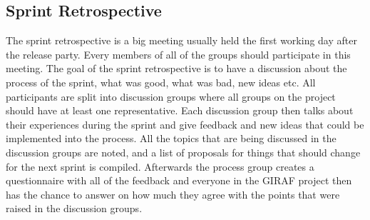 \subsection{Sprint Retrospective}
The sprint retrospective is a big meeting usually held the first working day after the release party.
Every members of all of the groups should participate in this meeting.
The goal of the sprint retrospective is to have a discussion about the process of the sprint, what was good, what was bad, new ideas etc.
All participants are split into discussion groups where all groups on the project should have at least one representative.
\newline
\newline
Each discussion group then talks about their experiences during the sprint and give feedback and new ideas that could be implemented into the process.
All the topics that are being discussed in the discussion groups are noted, and a list of proposals for things that should change for the next sprint is compiled.
Afterwards the process group creates a questionnaire with all of the feedback and everyone in the GIRAF project then has the chance to answer on how much they agree with the points that were raised in the discussion groups.

